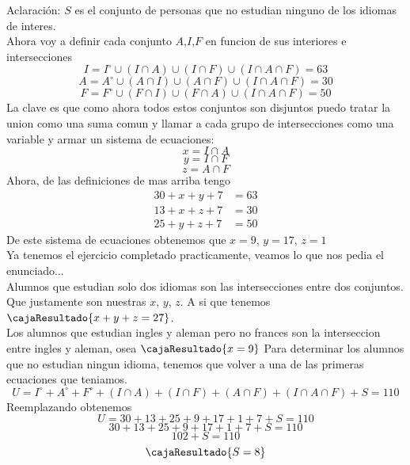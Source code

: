 \begin{enumerate}[label=\alph*)]
        Aclaración: $S$ es el conjunto de personas que no estudian ninguno de los idiomas de interes. \\
        Ahora voy a definir cada conjunto $A$,$I$,$F$ en funcion de sus interiores e intersecciones
        \[I = I^\circ \cup (I \cap A) \cup (I \cap F) \cup (I \cap A \cap F) = 63\]
        \[A = A^\circ \cup (A \cap I) \cup (A \cap F) \cup (I \cap A \cap F) = 30\]
        \[F = F^\circ \cup (F \cap I) \cup (F \cap A) \cup (I \cap A \cap F) = 50\]
        La clave es que como ahora todos estos conjuntos son disjuntos puedo tratar la union como una
        suma comun y llamar a cada grupo de intersecciones como una variable y armar un sistema de ecuaciones:
        \[x = I \cap A\]
        \[y = I \cap F\]
        \[z = A \cap F\]
        Ahora, de las definiciones de mas arriba tengo
        \begin{align*}
          30 + x + y + 7 & = 63 \\
          13 + x + z + 7 & = 30 \\
          25 + y + z + 7 & = 50
        \end{align*}
        De este sistema de ecuaciones obtenemos que $x = 9$, $y = 17$, $z = 1$ \\
        Ya tenemos el ejercicio completado practicamente, veamos lo que nos pedia el enunciado... \\
        Alumnos que estudian solo dos idiomas son las intersecciones entre dos conjuntos. Que justamente
        son nuestras $x$, $y$, $z$. A si que tenemos $\cajaResultado{x + y + z = 27}$. \\
        Los alumnos que estudian ingles y aleman pero no frances son la interseccion entre ingles y aleman, osea $\cajaResultado{x = 9}$
        Para determinar los alumnos que no estudian ningun idioma, tenemos que volver a una de las primeras ecuaciones que teniamos.
        \[U = I^\circ + A^\circ + F^\circ + (I \cap A)+ (I \cap F) + (A \cap F) + (I \cap A \cap F) + S = 110\]
        Reemplazando obtenemos
        \[U = 30 + 13 + 25 + 9 + 17 + 1 + 7 + S = 110\]
        \[30 + 13 + 25 + 9 + 17 + 1 + 7 + S = 110\]
        \[102 + S = 110\]
        \[\cajaResultado{S = 8}\]

\end{enumerate}

\begin{aportes}
  \item {}
  \item {}
\end{aportes}
